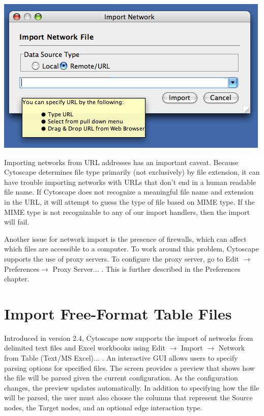 \begin{center}
 \includegraphics[width=\textwidth]{images/network_import_dialog2_25.png} 
\end{center}

 Importing networks from URL addresses has an important caveat. Because Cytoscape determines file type primarily (not exclusively) by file extension, it can have trouble importing networks with URLs that don't end in a human readable file name. If Cytoscape does not recognize a meaningful file name and extension in the URL, it will attempt to guess the type of file based on MIME type. If the MIME type is not recognizable to any of our import handlers, then the import will fail. 

 Another issue for network import is the presence of firewalls, which can affect which files are accessible to a computer. To work around this problem, Cytoscape supports the use of proxy servers. To configure the proxy server, go to Edit $\rightarrow$ Preferences$\rightarrow$ Proxy Server... . This is further described in the Preferences chapter. 

\section{Import Free-Format Table Files}
 Introduced in version 2.4, Cytoscape now supports the import of networks from delimited text files and Excel workbooks using Edit $\rightarrow$ Import $\rightarrow$ Network from Table (Text/MS Excel)... . An interactive GUI allows users to specify parsing options for specified files. The screen provides a preview that shows how the file will be parsed given the current configuration. As the configuration changes, the preview updates automatically. In addition to specifying how the file will be parsed, the user must also choose the columns that represent the Source nodes, the Target nodes, and an optional edge interaction type. 


